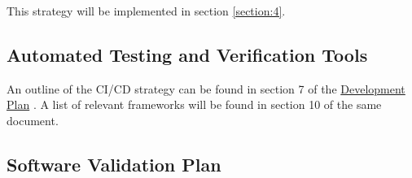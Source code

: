 \documentclass[12pt, titlepage]{article}
\begin{document}
This strategy will be implemented in section \ref{section:4}.

\subsection{Automated Testing and Verification Tools} \label{section:3.6}

An outline of the CI/CD strategy can be found in section 7 of the \href{https://github.com/Inreet-Kaur/capstone/blob/main/docs/DevelopmentPlan/DevelopmentPlan.pdf}{Development Plan} \citep{DevelopmentPlan}. A list of relevant frameworks will be found in section 10 of the same document.

\subsection{Software Validation Plan} \label{section:3.7}

\end{document}
